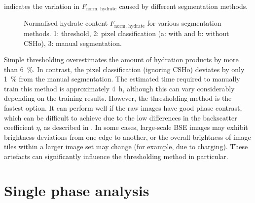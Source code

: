  indicates the variation in $F_\text{norm, hydrate}$ caused by different segmentation methods.

\begin{figure}[htbp]
	\centering
	\caption{
		Normalised hydrate content $F_\text{norm, hydrate}$ for various segmentation methods.
		1: threshold, 2: pixel classification (a: with and b: without \ac{CSHo}), 3: manual segmentation.
	}
	\label{fig:segmentation_hydrate_clinker_ratio}
\end{figure}

Simple thresholding overestimates the amount of hydration products by more than \qty{6}{\percent}.
In contrast, the pixel classification (ignoring \ac{CSHo}) deviates by only \qty{1}{\percent} from the manual segmentation.
The estimated time required to manually train this method is approximately \qty{4}{\hour}, although this can vary considerably depending on the training results.
However, the thresholding method is the fastest option.
It can perform well if the raw images have good phase contrast, which can be difficult to achieve due to the low differences in the backscatter coefficient $\eta$, as described in .
In some cases, large-scale \ac{BSE} images may exhibit brightness deviations from one edge to another, or the overall brightness of image tiles within a larger image set may change (for example, due to charging).
These artefacts can significantly influence the thresholding method in particular.


\section{Single phase analysis}

